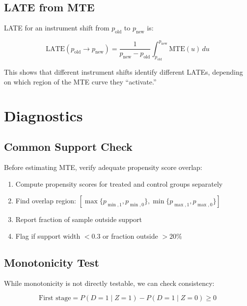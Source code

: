 \subsection{LATE from MTE}

LATE for an instrument shift from $p_{\text{old}}$ to $p_{\text{new}}$ is:

\begin{equation}
\text{LATE}(p_{\text{old}} \to p_{\text{new}}) = \frac{1}{p_{\text{new}} - p_{\text{old}}} \int_{p_{\text{old}}}^{p_{\text{new}}} \text{MTE}(u) \, du
\end{equation}

This shows that different instrument shifts identify different LATEs, depending on which region of the MTE curve they ``activate.''

\section{Diagnostics}
\label{sec:mte-diagnostics}

\subsection{Common Support Check}

Before estimating MTE, verify adequate propensity score overlap:

\begin{algorithm}
\label{alg:common-support}
\begin{enumerate}
\item Compute propensity scores for treated and control groups separately
\item Find overlap region: $[\max\{p_{\min,1}, p_{\min,0}\}, \min\{p_{\max,1}, p_{\max,0}\}]$
\item Report fraction of sample outside support
\item Flag if support width $< 0.3$ or fraction outside $> 20\%$
\end{enumerate}
\end{algorithm}

\subsection{Monotonicity Test}

While monotonicity is not directly testable, we can check consistency:

\begin{equation}
\text{First stage} = P(D=1 \mid Z=1) - P(D=1 \mid Z=0) \geq 0
\end{equation}

